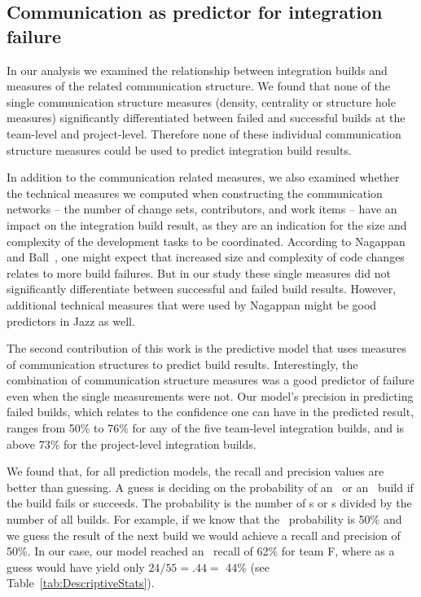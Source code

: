 \subsection{Communication as predictor for integration failure}
\label{subsec:commaspred}
In our analysis we examined the relationship between integration builds and
measures of the related communication structure. We found that none of the single
communication structure measures (density, centrality or structure hole measures)
significantly differentiated between failed and successful builds at the
team-level and project-level. Therefore none of these individual communication
structure measures could be used to predict integration build results.


In addition to the communication related measures, we also examined whether the
technical measures we computed when constructing the communication networks --
the number of change sets, contributors, and work items -- have an impact on the
integration build result, as they are an indication for the size and complexity
of the development tasks to be coordinated. According to Nagappan and
Ball~\cite{nagappan:icse:2005}, one might expect that increased size and complexity
of code changes relates to more build failures. But in our study these single
measures did not significantly differentiate between successful and failed build
results. However, additional technical measures that were used by Nagappan might
be good predictors in Jazz as well.



The second contribution of this work is the predictive model that uses measures
of communication structures to predict build results. Interestingly, the
combination of communication structure measures was a good predictor of failure
even when the single measurements were not. Our model's precision in predicting
failed builds, which relates to the confidence one can have in the predicted
result, ranges from 50\% to 76\% for any of the five team-level integration
builds, and is above 73\% for the project-level integration builds.

We found that, for all prediction models, the recall and precision values are
better than guessing. A guess is deciding on the probability of an \error\ or an
\ok\ build if the build fails or succeeds. The probability is the number of
\error s or \ok s divided by the number of all builds. For example, if we know
that the \error\ probability is 50\% and we guess the result of the next build we
would achieve a recall and precision of 50\%. In our case, our model reached an
\error\ recall of 62\% for team F, where as a guess would have yield only
$24/55=.44=$ 44\% (see Table~\ref{tab:DescriptiveStats}).

